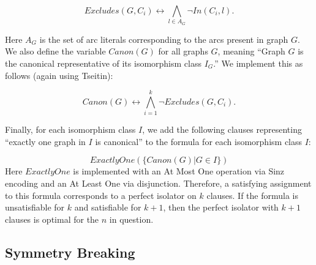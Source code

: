 \documentclass[conference]{IEEEtran}
\begin{document}
\begin{equation}
\mathit{Excludes}(G,C_i) \leftrightarrow \bigwedge\limits_{l \in A_G}\lnot \mathit{In}(C_i, l).
\end{equation}

\noindent Here $A_G$ is the set of arc literals corresponding to the arcs present in graph $G$. We also define the variable $\mathit{Canon}(G)$ for all graphs $G$, meaning ``Graph $G$ is the canonical representative of its isomorphism class $I_G$.'' We implement this as follows (again using Tseitin):

\begin{equation}
    \mathit{Canon}(G) \leftrightarrow \bigwedge\limits_{i=1}^k \lnot \mathit{Excludes}(G,C_i).
\end{equation}

Finally, for each isomorphism class $I$, we add the following clauses representing ``exactly one graph in $I$ is canonical'' to the formula for each isomorphism class $I$:

\begin{equation}
 \mathit{ExactlyOne}(\{\mathit{Canon}(G) | G \in I\})
 \label{eq:perfisoform}
\end{equation}
\noindent Here $\mathit{ExactlyOne}$ is implemented with an At Most One operation via Sinz encoding \cite{ref_sinz} and an At Least One via disjunction. Therefore, a satisfying assignment to this formula corresponds to a perfect isolator on $k$ clauses. If the formula is unsatisfiable for $k$ and satisfiable for $k+1$, then the perfect isolator with $k+1$ clauses is optimal for the $n$ in question.


\subsection{Symmetry Breaking}
\end{document}
